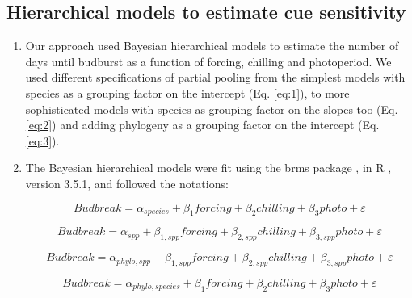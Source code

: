 \documentclass{article}\usepackage[]{graphicx}\usepackage[]{color}
\begin{document}
\subsection*{Hierarchical models to estimate cue sensitivity}
\begin{enumerate}
\item Our approach used Bayesian hierarchical models to estimate the number of days until budburst as a function of forcing, chilling and photoperiod. We used different specifications of partial pooling from the simplest models with species as a grouping factor on the intercept (Eq. \ref{eq:1}), to more sophisticated models with species as grouping factor on the slopes too (Eq. \ref{eq:2}) and adding phylogeny as a grouping factor on the intercept (Eq. \ref{eq:3}).    

\item The Bayesian hierarchical models were fit using the brms package \citep{brms}, in R \citep{R}, version 3.5.1, and followed the notations: 


\begin{equation}
\label{eq:1} 
Budbreak = \alpha_{species} + \beta_{1}forcing 
+ \beta_{2}chilling + \beta_{3}photo + \varepsilon
\end{equation}


\begin{equation} 
\label{eq:2} 
Budbreak = \alpha_{spp} + \beta_{1,spp}forcing
+ \beta_{2,spp}chilling + \beta_{3,spp}photo + \varepsilon\end{equation}

\begin{equation} 
\label{eq:3} 
Budbreak = \alpha_{phylo,spp} + \beta_{1,spp}forcing
+ \beta_{2,spp}chilling + \beta_{3,spp}photo + \varepsilon
\end{equation}

\begin{equation} 
\label{eq:4} 
Budbreak = \alpha_{phylo,species} + \beta_{1}forcing
+ \beta_{2}chilling + \beta_{3}photo + \varepsilon
\end{equation}



\end{enumerate}
\end{document}
